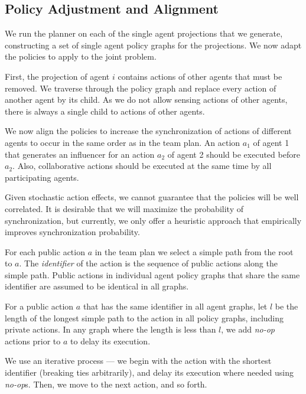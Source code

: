 \documentclass[letterpaper]{article} %
\theoremstyle{definition}
\begin{document}
\subsection{Policy Adjustment and Alignment}

We run the planner on each of the single agent projections that we generate, constructing a set of single agent policy graphs for the projections. We now adapt the policies to apply to the joint problem. 

First, the projection of agent $i$ contains actions of other agents that must be removed. We traverse through the policy graph and replace every action of another agent by its child. As we do not allow sensing actions of other agents, there is always a single child to actions of other agents.

We now align the policies to increase the synchronization of actions of different agents to occur in the same order as in the team plan. An action $a_1$ of agent 1 that generates an influencer for an action $a_2$ of agent 2 should be executed before $a_2$. Also, collaborative actions should be executed at the same time by all participating agents.  

Given stochastic action effects, we cannot guarantee that the policies will be well correlated. It is desirable that we will maximize the probability of synchronization, but currently, we only offer a heuristic approach that empirically improves synchronization probability.

For each public action $a$ in the team plan we select a simple path from the root to $a$. The {\em identifier} of the action is the sequence of public actions along the simple path. Public actions in individual agent policy graphs that share the same identifier are assumed to be identical in all graphs.

For a public action $a$ that has the same identifier in all agent graphs, let $l$ be the length of the longest simple path to the action in all policy graphs, including private actions. In any graph where the length is less than $l$, we add {\em no-op} actions prior to $a$ to delay its execution.

We use an iterative process --- we begin with the action with the shortest identifier (breaking ties arbitrarily), and delay its execution where needed using {\em no-op}s. Then, we move to the next action, and so forth.
\end{document}
